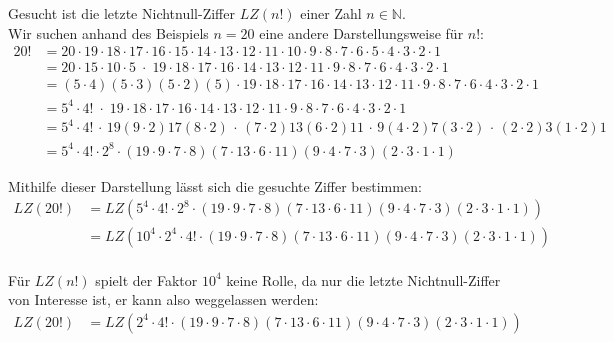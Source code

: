 \setlength{\mathindent}{0.5cm}

Gesucht ist die letzte Nichtnull-Ziffer $LZ(n!)$ einer Zahl $n \in \mathbb{N}$. \\
Wir suchen anhand des Beispiels $n=20$ eine andere Darstellungsweise für $n!$:
\begin{equation*}
	\begin{split}
		20! &= 20\cdot19\cdot18\cdot17\cdot16\cdot15\cdot14\cdot13\cdot12\cdot11\cdot10\cdot9\cdot8\cdot7\cdot6\cdot5\cdot4\cdot3\cdot2\cdot1 \\
		&= 20\cdot15\cdot10\cdot5 \;\cdot\; 19\cdot18\cdot17\cdot16\cdot14\cdot13\cdot12\cdot11\cdot9\cdot8\cdot7\cdot6\cdot4\cdot3\cdot2\cdot1 \\
		&= (5\cdot4)(5\cdot3)(5\cdot2)(5) \cdot 19\cdot18\cdot17\cdot16\cdot14\cdot13\cdot12\cdot11\cdot9\cdot8\cdot7\cdot6\cdot4\cdot3\cdot2\cdot1 \\
		&= 5^4 \cdot 4! \;\cdot\; 19\cdot18\cdot17\cdot16\cdot14\cdot13\cdot12\cdot11\cdot9\cdot8\cdot7\cdot6\cdot4\cdot3\cdot2\cdot1 \\
		&= 5^4 \cdot 4! \,\cdot\, 19(9\cdot2)17(8\cdot2)\,\cdot\,(7\cdot2)13(6\cdot2)11\,\cdot\,9(4\cdot2)7(3\cdot2)\,\cdot\,(2\cdot2)3(1\cdot2)1 \\
		&= 5^4 \cdot 4! \cdot 2^8 \cdot (19\cdot9\cdot7\cdot8)(7\cdot13\cdot6\cdot11)(9\cdot4\cdot7\cdot3)(2\cdot3\cdot1\cdot1)
	\end{split}
\end{equation*}

Mithilfe dieser Darstellung lässt sich die gesuchte Ziffer bestimmen:
\begin{equation*}
	\begin{split}
		LZ(20!) &= LZ\left(5^4 \cdot 4! \cdot 2^8 \cdot (19\cdot9\cdot7\cdot8)(7\cdot13\cdot6\cdot11)(9\cdot4\cdot7\cdot3)(2\cdot3\cdot1\cdot1)\right) \\
		&= LZ\left(10^4 \cdot 2^4 \cdot 4! \cdot (19\cdot9\cdot7\cdot8)(7\cdot13\cdot6\cdot11)(9\cdot4\cdot7\cdot3)(2\cdot3\cdot1\cdot1)\right) \\
	\end{split}
\end{equation*}

Für $LZ(n!)$ spielt der Faktor $10^4$ keine Rolle, da nur die letzte Nichtnull-Ziffer von Interesse ist, er kann also weggelassen werden:
\begin{equation*}
	\begin{split}
		LZ(20!) &= LZ\left(2^4 \cdot 4! \cdot (19\cdot9\cdot7\cdot8)(7\cdot13\cdot6\cdot11)(9\cdot4\cdot7\cdot3)(2\cdot3\cdot1\cdot1)\right)
	\end{split}
\end{equation*}

